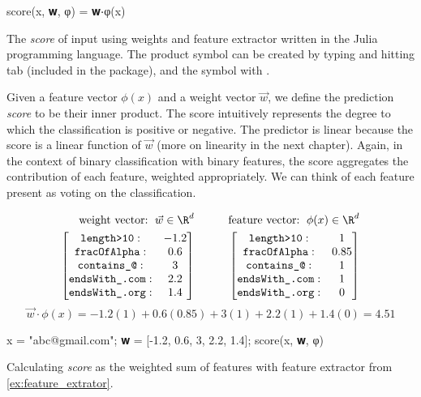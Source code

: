 \begin{algorithm}
\begin{juliaverbatim}
score(x, 𝐰, φ) = 𝐰⋅φ(x)
\end{juliaverbatim}

\caption{
    \label{alg:score}
    The \textit{score} of input  using weights  and feature extractor  written in the Julia programming language.
    The  product symbol  can be created by typing \jlv{\cdot} and hitting tab (included in the  package), and the  symbol with \jlv{\bfw}.
}
\end{algorithm}

Given a feature vector $\phi(x)$ and a weight vector $\vec{w}$, we define the prediction \textit{score} to be their inner product.
The score intuitively represents the degree to which the classification is positive or negative.
The predictor is linear because the score is a linear function of $\vec{w}$ (more on linearity in the next chapter).
Again, in the context of binary classification with binary features, the score aggregates the contribution of each feature, weighted appropriately.
We can think of each feature present as voting on the classification.


\begin{example}
    \[\begin{aligned}
        \text{weight vector: }\, \vec{w} \in \R^d & \qquad & \text{feature vector: }\, \phi(x) \in \R^d\\
        \begin{bmatrix}
            \texttt{length>10}: & -1.2\\
            \texttt{fracOfAlpha}: & 0.6\\
            \texttt{contains\_@}: & 3\\
            \texttt{endsWith\_.com}: & 2.2\\
            \texttt{endsWith\_.org}: & 1.4
        \end{bmatrix} & \qquad & \begin{bmatrix}
            \texttt{length>10}: & 1\\
            \texttt{fracOfAlpha}: & 0.85\\
            \texttt{contains\_@}: & 1\\
            \texttt{endsWith\_.com}: & 1\\
            \texttt{endsWith\_.org}: & 0
        \end{bmatrix}
    \end{aligned}\]
    \[\vec{w}\cdot\phi(x) = -1.2(1) + 0.6(0.85) + 3(1) + 2.2(1) + 1.4(0) = 4.51\]
\begin{juliaconsole}
x = "abc@gmail.com";
𝐰 = [-1.2, 0.6, 3, 2.2, 1.4];
score(x, 𝐰, φ)
\end{juliaconsole}

\caption{
    \label{ex:score}
    Calculating \textit{score} as the weighted sum of features with feature extractor  from \cref{ex:feature_extrator}.
}
\end{example}




